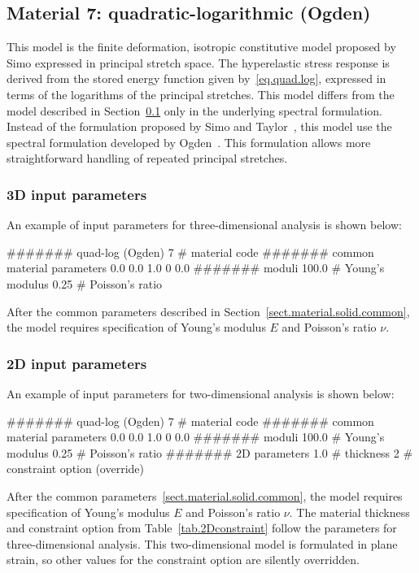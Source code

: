 \subsection{Material 7: quadratic-logarithmic (Ogden)}
\label{sect.mat.QuadLog.Ogden}
This model is the finite deformation, isotropic
constitutive model proposed by 
Simo \etal\cite{Simo1992} expressed in
principal stretch space.
The hyperelastic stress response is derived from the
stored energy function given by~\eqref{eq.quad.log}, 
expressed in terms of the
logarithms of the principal stretches.
This model differs from the model described in 
Section~\ref{sect.mat.QuadLog.Ogden} only in the underlying spectral
formulation. Instead of the formulation proposed by
Simo and Taylor~\cite{Simo1991}, this model use the spectral
formulation developed by Ogden~\cite{Ogden1983}.
This formulation allows more straightforward handling of 
repeated principal stretches.

\subsubsection{3D input parameters}
An example of input parameters for three-dimensional analysis is shown 
below:
\begin{inputfile}
####### quad-log (Ogden)
7     # material code
####### common material parameters
0.0    0.0    1.0
0      0.0
####### moduli
100.0 # Young's modulus
0.25  # Poisson's ratio
\end{inputfile}
After the common parameters described in 
Section~\ref{sect.material.solid.common}, the 
model requires specification of Young's modulus 
$E$ and Poisson's ratio $\nu$.

\subsubsection{2D input parameters}
An example of input parameters for two-dimensional analysis is shown 
below:
\begin{inputfile}
####### quad-log (Ogden)
7     # material code
####### common material parameters
0.0    0.0    1.0
0      0.0
####### moduli
100.0 # Young's modulus
0.25  # Poisson's ratio
####### 2D parameters
1.0   # thickness
2     # constraint option (override)
\end{inputfile}
After the common parameters~\ref{sect.material.solid.common}, the 
model requires specification of Young's modulus $E$ and Poisson's 
ratio $\nu$. The material thickness and 
constraint option from Table~\ref{tab.2Dconstraint} 
follow the parameters for three-dimensional analysis.
This two-dimensional model is formulated in plane strain,
so other values for the constraint option are silently
overridden.

